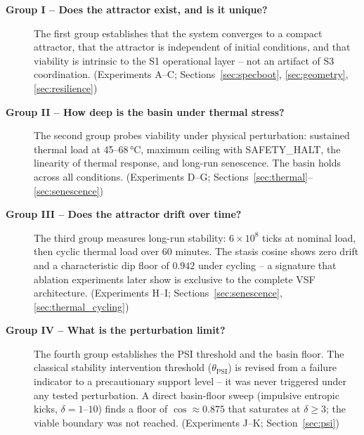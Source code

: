 \documentclass[11pt, a4paper]{article}
\begin{document}
\begin{description}

  \item[\textbf{Group I -- Does the attractor exist, and is it unique?}]
    The first group establishes that the system converges to a compact
    attractor, that the attractor is independent of initial conditions,
    and that viability is intrinsic to the S1 operational layer -- not
    an artifact of S3 coordination.
    (Experiments A--C; Sections~\ref{sec:specboot}, \ref{sec:geometry},
    \ref{sec:resilience})

  \item[\textbf{Group II -- How deep is the basin under thermal stress?}]
    The second group probes viability under physical perturbation: sustained
    thermal load at 45--68\,°C, maximum ceiling with SAFETY\_HALT, the
    linearity of thermal response, and long-run senescence.
    The basin holds across all conditions.
    (Experiments D--G; Sections~\ref{sec:thermal}--\ref{sec:senescence})

  \item[\textbf{Group III -- Does the attractor drift over time?}]
    The third group measures long-run stability: $6\times 10^8$ ticks at
    nominal load, then cyclic thermal load over 60 minutes.
    The stasis cosine shows zero drift and a characteristic dip floor
    of $0.942$ under cycling -- a signature that ablation experiments
    later show is exclusive to the complete VSF architecture.
    (Experiments H--I; Sections~\ref{sec:senescence}, \ref{sec:thermal_cycling})

  \item[\textbf{Group IV -- What is the perturbation limit?}]
    The fourth group establishes the PSI threshold and the basin floor.
    The classical stability intervention threshold ($\theta_\text{PSI}$)
    is revised from a failure indicator to a precautionary support level --
    it was never triggered under any tested perturbation.
    A direct basin-floor sweep (impulsive entropic kicks, $\delta=1$--$10$)
    finds a floor of $\cos \approx 0.875$ that saturates at $\delta \geq 3$;
    the viable boundary was not reached.
    (Experiments J--K; Section~\ref{sec:psi})


\end{description}
\end{document}
